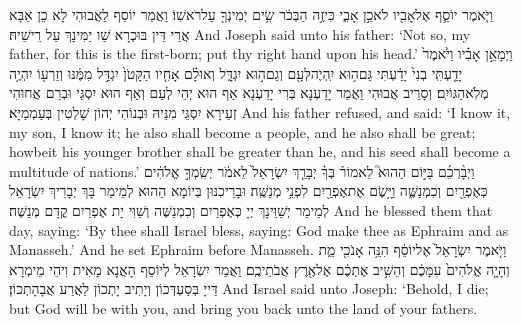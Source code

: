 {וַיֹּ֧אמֶר יוֹסֵ֛ף אֶל\maqqaf אָבִ֖יו לֹא\maqqaf כֵ֣ן אָבִ֑י כִּי\maqqaf זֶ֣ה הַבְּכֹ֔ר שִׂ֥ים יְמִינְךָ֖ עַל\maqqaf רֹאשֽׁוֹ׃}
{וַאֲמַר יוֹסֵף לַאֲבוּהִי לָא כֵן אַבָּא אֲרֵי דֵּין בּוּכְרָא שַׁו יַמִּינָךְ עַל רֵישֵׁיהּ׃}
{And Joseph said unto his father: ‘Not so, my father, for this is the first-born; put thy right hand upon his head.’}{}
{וַיְמָאֵ֣ן אָבִ֗יו וַיֹּ֙אמֶר֙ יָדַ֤עְתִּֽי בְנִי֙ יָדַ֔עְתִּי גַּם\maqqaf ה֥וּא יִֽהְיֶה\maqqaf לְּעָ֖ם וְגַם\maqqaf ה֣וּא יִגְדָּ֑ל וְאוּלָ֗ם אָחִ֤יו הַקָּטֹן֙ יִגְדַּ֣ל מִמֶּ֔נּוּ וְזַרְע֖וֹ יִהְיֶ֥ה מְלֹֽא\maqqaf הַגּוֹיִֽם׃}
{וְסָרֵיב אֲבוּהִי וַאֲמַר יָדַעְנָא בְּרִי יָדַעְנָא אַף הוּא יְהֵי לְעַם וְאַף הוּא יִסְגֵּי וּבְרַם אֲחוּהִי זְעֵירָא יִסְגֵּי מִנֵּיהּ וּבְנוֹהִי יְהוֹן שָׁלְטִין בְּעַמְמַיָּא׃}
{And his father refused, and said: ‘I know it, my son, I know it; he also shall become a people, and he also shall be great; howbeit his younger brother shall be greater than he, and his seed shall become a multitude of nations.’}{}
{וַיְבָ֨רְכֵ֜ם בַּיּ֣וֹם הַהוּא֮ לֵאמוֹר֒ בְּךָ֗ יְבָרֵ֤ךְ יִשְׂרָאֵל֙ לֵאמֹ֔ר יְשִֽׂמְךָ֣ אֱלֹהִ֔ים כְּאֶפְרַ֖יִם וְכִמְנַשֶּׁ֑ה וַיָּ֥שֶׂם אֶת\maqqaf אֶפְרַ֖יִם לִפְנֵ֥י מְנַשֶּֽׁה׃}
{וּבָרֵיכִנּוּן בְּיוֹמָא הַהוּא לְמֵימַר בָּךְ יְבָרֵיךְ יִשְׂרָאֵל לְמֵימַר יְשַׁוֵּינָךְ יְיָ כְּאֶפְרַיִם וְכִמְנַשֶּׁה וְשַׁוִּי יָת אֶפְרַיִם קֳדָם מְנַשֶּׁה׃}
{And he blessed them that day, saying: ‘By thee shall Israel bless, saying: God make thee as Ephraim and as Manasseh.’ And he set Ephraim before Manasseh.}{}
{וַיֹּ֤אמֶר יִשְׂרָאֵל֙ אֶל\maqqaf יוֹסֵ֔ף הִנֵּ֥ה אָנֹכִ֖י מֵ֑ת וְהָיָ֤ה אֱלֹהִים֙ עִמָּכֶ֔ם וְהֵשִׁ֣יב אֶתְכֶ֔ם אֶל\maqqaf אֶ֖רֶץ אֲבֹתֵיכֶֽם׃}
{וַאֲמַר יִשְׂרָאֵל לְיוֹסֵף הָאֲנָא מָאִית וִיהֵי מֵימְרָא דַּייָ בְּסַעְדְּכוֹן וְיָתִיב יָתְכוֹן לַאֲרַע אֲבָהָתְכוֹן׃}
{And Israel said unto Joseph: ‘Behold, I die; but God will be with you, and bring you back unto the land of your fathers.}{}
